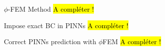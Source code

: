\begin{frame}{$\phi$-FEM Method}
	\hl{A compléter !}
\end{frame}

\begin{frame}{Impose exact BC in PINNs}
	\hl{A compléter !}
\end{frame}

\begin{frame}{Correct PINNs prediction with $\phi$FEM}
	\hl{A compléter !}
\end{frame}